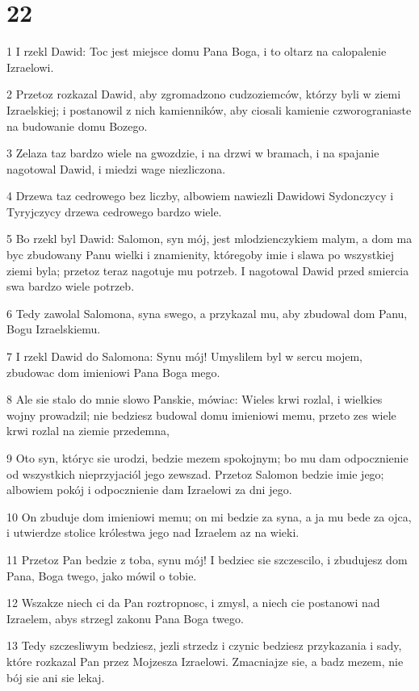 \chapter{22}

\par 1 I rzekl Dawid: Toc jest miejsce domu Pana Boga, i to oltarz na calopalenie Izraelowi.
\par 2 Przetoz rozkazal Dawid, aby zgromadzono cudzoziemców, którzy byli w ziemi Izraelskiej; i postanowil z nich kamienników, aby ciosali kamienie czworograniaste na budowanie domu Bozego.
\par 3 Zelaza taz bardzo wiele na gwozdzie, i na drzwi w bramach, i na spajanie nagotowal Dawid, i miedzi wage niezliczona.
\par 4 Drzewa taz cedrowego bez liczby, albowiem nawiezli Dawidowi Sydonczycy i Tyryjczycy drzewa cedrowego bardzo wiele.
\par 5 Bo rzekl byl Dawid: Salomon, syn mój, jest mlodzienczykiem malym, a dom ma byc zbudowany Panu wielki i znamienity, któregoby imie i slawa po wszystkiej ziemi byla; przetoz teraz nagotuje mu potrzeb. I nagotowal Dawid przed smiercia swa bardzo wiele potrzeb.
\par 6 Tedy zawolal Salomona, syna swego, a przykazal mu, aby zbudowal dom Panu, Bogu Izraelskiemu.
\par 7 I rzekl Dawid do Salomona: Synu mój! Umyslilem byl w sercu mojem, zbudowac dom imieniowi Pana Boga mego.
\par 8 Ale sie stalo do mnie slowo Panskie, mówiac: Wieles krwi rozlal, i wielkies wojny prowadzil; nie bedziesz budowal domu imieniowi memu, przeto zes wiele krwi rozlal na ziemie przedemna,
\par 9 Oto syn, któryc sie urodzi, bedzie mezem spokojnym; bo mu dam odpocznienie od wszystkich nieprzyjaciól jego zewszad. Przetoz Salomon bedzie imie jego; albowiem pokój i odpocznienie dam Izraelowi za dni jego.
\par 10 On zbuduje dom imieniowi memu; on mi bedzie za syna, a ja mu bede za ojca, i utwierdze stolice królestwa jego nad Izraelem az na wieki.
\par 11 Przetoz Pan bedzie z toba, synu mój! I bedziec sie szczescilo, i zbudujesz dom Pana, Boga twego, jako mówil o tobie.
\par 12 Wszakze niech ci da Pan roztropnosc, i zmysl, a niech cie postanowi nad Izraelem, abys strzegl zakonu Pana Boga twego.
\par 13 Tedy szczesliwym bedziesz, jezli strzedz i czynic bedziesz przykazania i sady, które rozkazal Pan przez Mojzesza Izraelowi. Zmacniajze sie, a badz mezem, nie bój sie ani sie lekaj.

